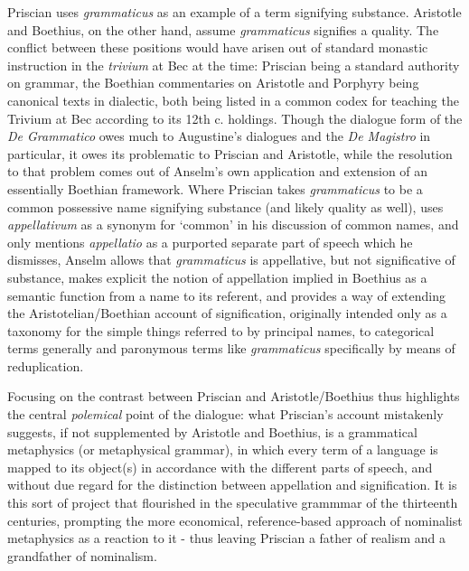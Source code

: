 \documentclass[]{article}
\begin{document}
Priscian uses \textit{grammaticus} as an example of a term signifying substance. Aristotle and Boethius, on the other hand, assume \textit{grammaticus} signifies a quality. The conflict between these positions would have arisen out of standard monastic instruction in the \textit{trivium} at Bec at the time: Priscian being a standard authority on grammar, the Boethian commentaries on Aristotle and Porphyry being canonical texts in dialectic, both being listed in a common codex for teaching the Trivium at Bec according to its 12th c. holdings. Though the dialogue form of the \textit{De Grammatico} owes much to Augustine's dialogues and the \textit{De Magistro} in particular, it owes its problematic to Priscian and Aristotle, while the resolution to that problem comes out of Anselm's own application and extension of an essentially Boethian framework. Where Priscian takes \textit{grammaticus} to be a common possessive name signifying substance (and likely quality as well), uses \textit{appellativum} as a synonym for `common' in his discussion of common names, and only mentions \textit{appellatio} as a purported separate part of speech which he dismisses, Anselm allows that \textit{grammaticus} is appellative, but not significative of substance, makes explicit the notion of appellation implied in Boethius as a semantic function from a name to its referent, and provides a way of extending the Aristotelian/Boethian account of signification, originally intended only as a taxonomy for the simple things referred to by principal names, to categorical terms generally and paronymous terms like \textit{grammaticus} specifically by means of reduplication. 

Focusing on the contrast between Priscian and Aristotle/Boethius thus highlights the central \textit{polemical} point of the dialogue: what Priscian's account mistakenly suggests, if not supplemented by Aristotle and Boethius, is a grammatical metaphysics (or metaphysical grammar), in which every term of a language is mapped to its object(s) in accordance with the different parts of speech, and without due regard for the distinction between appellation and signification. It is this sort of project that flourished in the speculative grammmar of the thirteenth centuries, prompting the more economical, reference-based approach of nominalist metaphysics as a reaction to it - thus leaving Priscian a father of realism and a grandfather of nominalism. 
\end{document}
